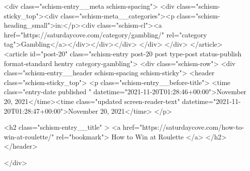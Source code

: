 {		<div class="schism-entry__meta schism-spacing">			<div class="schism-sticky_top"><div class="schism-meta__categories"><p class="schism-heading_small">in:</p><div class="schism-cl"><a href="https://saturdaycove.com/category/gambling/" rel="category tag">Gambling</a></div></div></div>		</div>
	</div>
</article>
<article id="post-20" class="schism-entry post-20 post type-post status-publish format-standard hentry category-gambling">
	<div class="schism-row">		<div class="schism-entry__header schism-spacing schism-sticky">			<header class="schism-sticky_top">				<p class="schism-entry__before-title">
					<time class="entry-date published " datetime="2021-11-20T01:28:46+00:00">November 20, 2021</time><time class="updated screen-reader-text" datetime="2021-11-20T01:28:47+00:00">November 20, 2021</time>				</p>

				<h2 class="schism-entry__title" >
					<a href="https://saturdaycove.com/how-to-win-at-roulette/" rel="bookmark">
						How to Win at Roulette					</a>
				</h2>
			</header>

					</div>

}
